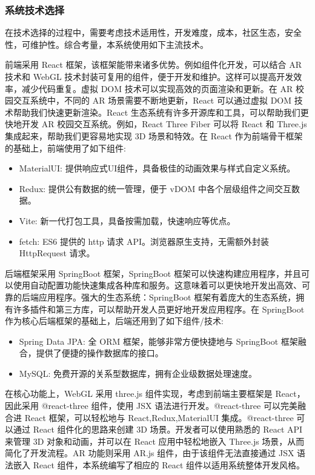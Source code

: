 \subsubsection{系统技术选择}

在技术选择的过程中，需要考虑技术适用性，开发难度，成本，社区生态，安全性，可维护性。综合考量，本系统使用如下主流技术。

前端采用 React 框架，该框架能带来诸多优势。例如组件化开发，可以结合 AR 技术和 WebGL 技术封装可复用的组件，便于开发和维护。这样可以提高开发效率，减少代码重复。虚拟 DOM 技术可以实现高效的页面渲染和更新。在 AR 校园交互系统中，不同的 AR 场景需要不断地更新，React 可以通过虚拟 DOM 技术帮助我们快速更新渲染\cite{gackenheimer2015introduction}。React 生态系统有许多开源库和工具，可以帮助我们更快地开发 AR 校园交互系统。例如，React Three Fiber 可以将 React 和 Three.js 集成起来，帮助我们更容易地实现 3D 场景和特效。在 React 作为前端骨干框架的基础上，前端使用了如下组件:
\begin{itemize}
  \item MaterialUI: 提供响应式UI组件，具备极佳的动画效果与样式自定义系统。
  \item Redux: 提供公有数据的统一管理，便于 vDOM 中各个层级组件之间交互数据。
  \item Vite: 新一代打包工具，具备按需加载，快速响应等优点。
  \item fetch: ES6 提供的 http 请求 API。浏览器原生支持，无需额外封装 HttpRequest 请求。
\end{itemize}

后端框架采用 SpringBoot 框架，SpringBoot 框架可以快速构建应用程序，并且可以使用自动配置功能快速集成各种库和服务。这意味着可以更快地开发出高效、可靠的后端应用程序。强大的生态系统：SpringBoot 框架有着庞大的生态系统，拥有许多插件和第三方库，可以帮助开发人员更好地开发应用程序\cite{guntupally2018spring}。在 SpringBoot 作为核心后端框架的基础上，后端还用到了如下组件/技术:
\begin{itemize}
  \item Spring Data JPA: 全 ORM 框架，能够非常方便快捷地与 SpringBoot 框架融合，提供了便捷的操作数据库的接口。
  \item MySQL: 免费开源的关系型数据库，拥有企业级数据处理速度。
\end{itemize}

在核心功能上，WebGL 采用 three.js 组件实现，考虑到前端主要框架是 React，因此采用 @react-three 组件，使用 JSX 语法进行开发。@react-three 可以完美融合进 React 框架，可以轻松地与 React,Redux,MaterialUI 集成。@react-three 可以通过 React 组件化的思路来创建 3D 场景。开发者可以使用熟悉的 React API 来管理 3D 对象和动画，并可以在 React 应用中轻松地嵌入 Three.js 场景，从而简化了开发流程\cite{mysore2021splunk+}。AR 功能则采用 AR.js 组件，由于该组件无法直接通过 JSX 语法嵌入 React 组件，本系统编写了相应的 React 组件以适用系统整体开发风格。

